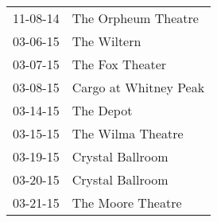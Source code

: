 \begin{supertabular}{p{0.07\textwidth}p{0.23\textwidth}}
 11-08-14 &    The Orpheum Theatre \\
 03-06-15 &            The Wiltern \\
 03-07-15 &        The Fox Theater \\
 03-08-15 &  Cargo at Whitney Peak \\
 03-14-15 &              The Depot \\
 03-15-15 &      The Wilma Theatre \\
 03-19-15 &       Crystal Ballroom \\
 03-20-15 &       Crystal Ballroom \\
 03-21-15 &      The Moore Theatre \\
\end{supertabular}
